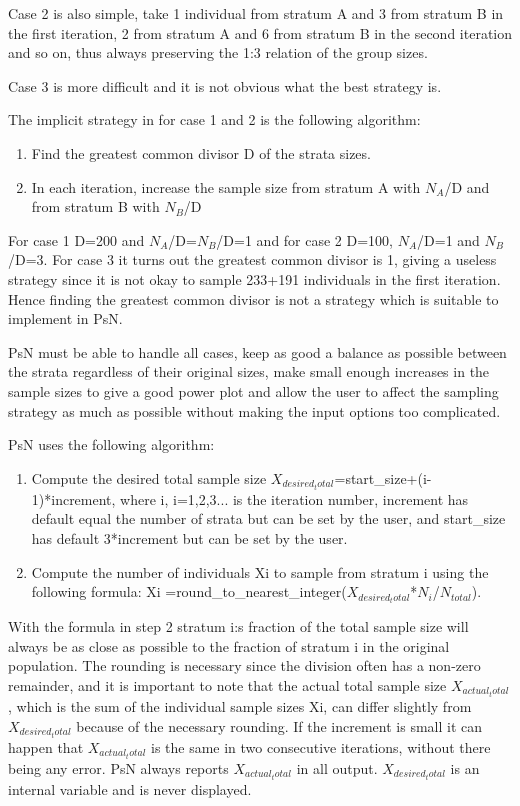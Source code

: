 Case 2 is also simple, take 1 individual from stratum A and 3 from stratum B in the first iteration, 2 from stratum A and 6 from stratum B in the second iteration and so on, thus always preserving the 1:3 relation of the group sizes. 

Case 3 is more difficult and it is not obvious what the best strategy is. 

The implicit strategy in for case 1 and 2 is the following algorithm: 

\begin{enumerate}
	\item Find the greatest common divisor D of the strata sizes.
	\item In each iteration, increase the sample size from stratum A with $N_A$/D and from stratum B with $N_B$/D
\end{enumerate}
For case 1 D=200 and $N_A$/D=$N_B$/D=1 and for case 2 D=100, $N_A$/D=1 and $N_B$/D=3. For case 3 it turns out the greatest common divisor is 1, giving a useless strategy since it is not okay to sample 233+191 individuals in the first iteration. Hence finding the greatest common divisor is not a strategy which is suitable to implement in PsN.

PsN must be able to handle all cases, keep as good a balance as possible between the strata regardless of their original sizes, make small enough increases in the sample sizes to give a good power plot and allow the user to affect the sampling strategy as much as possible without making the input options too complicated.

PsN uses the following algorithm:
\begin{enumerate}
	\item Compute the desired total sample size $X_{desired_total}$=start\_size+(i-1)*increment, where i, i=1,2,3... 	is the iteration number, increment has default equal the number of strata but can be set by the 	user, and start\_size has default 3*increment but can be set by the user.
	\item Compute the number of individuals Xi to sample from stratum i using the following formula: 	Xi =round\_to\_nearest\_integer($X_{desired_total}$*$N_i$/$N_{total}$). 
\end{enumerate}
With the formula in step 2 stratum i:s fraction of the total sample size will always be as close as possible to the fraction of stratum i in the original population. The rounding is necessary since the division often has a non-zero remainder, and it is important to note that the actual total sample size $X_{actual_total}$, which is the sum of the individual sample sizes Xi, can differ slightly from $X_{desired_total}$ because of the necessary rounding. If the increment is small it can happen that $X_{actual_total}$ is the same in two consecutive iterations, without there being any error. PsN always reports $X_{actual_total}$ in all output. $X_{desired_total}$ is an internal variable and is never displayed.

